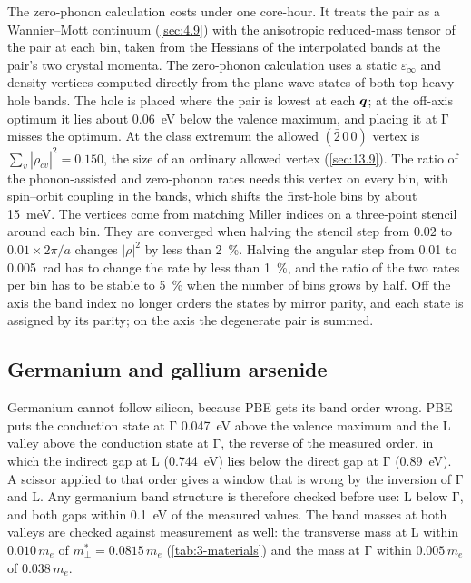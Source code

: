 The zero-phonon calculation costs under one core-hour. It treats the pair as a Wannier--Mott continuum (\cref{sec:4.9}) with the anisotropic reduced-mass tensor of the pair at each bin, taken from the Hessians of the interpolated bands at the pair's two crystal momenta. The zero-phonon calculation uses a static $\varepsilon_\infty$ and density vertices computed directly from the plane-wave states of both top heavy-hole bands. The hole is placed where the pair is lowest at each $\bm{q}$; at the off-axis optimum it lies about \SI{0.06}{eV} below the valence maximum, and placing it at $\mathrm{\Gamma}$ misses the optimum. At the class extremum the allowed $(\bar2\,0\,0)$ vertex is $\sum_v|\rho_{cv}|^2 = 0.150$, the size of an ordinary allowed vertex (\cref{sec:13.9}). The ratio of the phonon-assisted and zero-phonon rates needs this vertex on every bin, with spin--orbit coupling in the bands, which shifts the first-hole bins by about \SI{15}{meV}. The vertices come from matching Miller indices on a three-point stencil around each bin. They are converged when halving the stencil step from $0.02$ to $0.01\times2\pi/a$ changes $|\rho|^2$ by less than \SI{2}{\percent}. Halving the angular step from 0.01 to \SI{0.005}{rad} has to change the rate by less than \SI{1}{\percent}, and the ratio of the two rates per bin has to be stable to \SI{5}{\percent} when the number of bins grows by half. Off the axis the band index no longer orders the states by mirror parity, and each state is assigned by its parity; on the axis the degenerate pair is summed.

\subsection{Germanium and gallium arsenide}

Germanium cannot follow silicon, because PBE gets its band order wrong. PBE puts the conduction state at $\mathrm{\Gamma}$ \SI{0.047}{eV} above the valence maximum and the L valley above the conduction state at $\mathrm{\Gamma}$, the reverse of the measured order, in which the indirect gap at L (\SI{0.744}{eV}) lies below the direct gap at $\mathrm{\Gamma}$ (\SI{0.89}{eV}). A scissor applied to that order gives a window that is wrong by the inversion of $\mathrm{\Gamma}$ and L. Any germanium band structure is therefore checked before use: L below $\mathrm{\Gamma}$, and both gaps within \SI{0.1}{eV} of the measured values. The band masses at both valleys are checked against measurement as well: the transverse mass at L within $0.010\,m_e$ of $m^*_\perp = 0.0815\,m_e$ (\cref{tab:3-materials}) and the mass at $\mathrm{\Gamma}$ within $0.005\,m_e$ of $0.038\,m_e$.

